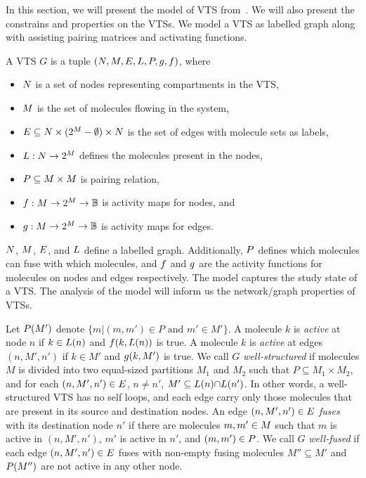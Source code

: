 In this section, we will present the model of VTS from~\cite{PloS,SASB}.
%
We will also present the constrains and properties on the VTSs.   
%
We model a VTS as labelled graph along with assisting pairing matrices and
activating functions.

\begin{df}
  A VTS $G$ is a tuple $(N,M,E,L,P,g,f)$, where
  \begin{itemize}
  \item $N$ is a set of nodes representing compartments in the VTS,
  \item $M$ is the set of molecules flowing in the system, 
  \item $E \subseteq N \times (2^{M}-\emptyset) \times N$ is the
    set of edges with molecule sets as labels,
  \item $L : N \rightarrow 2^{M}$ defines the molecules present in the nodes,
  \item $P \subseteq M \times M$ is pairing relation,
  \item $f : M \rightarrow 2^{M} \rightarrow \mathbb{B}$ is activity maps for nodes, and
  \item $g : M \rightarrow 2^{M} \rightarrow \mathbb{B} $ is activity maps for edges.
  \end{itemize}
\end{df}
$N$, $M$, $E$, and $L$ define a labelled graph.
%
Additionally, $P$ defines which molecules can fuse with which molecules,
and
$f$ and $g$ are the activity functions for molecules on
nodes and edges respectively.
%
The model captures the study state of a VTS.
%
The analysis of the model will inform us the network/graph properties of
VTSs.

Let $P(M')$ denote $\{m|(m,m') \in P \text{ and } m' \in M'\}$.
%
A molecule $k$ is {\em active} at node $n$ if $k \in L(n)$ and
$f(k,L(n))$ is true.
%
A molecule $k$ is {\em active} at edges $(n,M',n')$ if $k \in M'$ and
$g(k,M')$ is true.
%
We call $G$ {\em well-structured} if molecules $M$ is divided into
two equal-sized partitions $M_1$ and $M_2$ such that
$P \subseteq M_1 \times M_2$, and
for each $(n,M',n') \in E$, $n \neq n'$, 
$M' \subseteq L(n) {\cap} L(n')$.
%
In other words, a well-structured VTS has no self loops, and 
each edge carry only those molecules that are present in its source
and destination nodes. 
%
An edge $(n,M',n') \in E$ {\em fuses} with its destination node $n'$
if there are molecules $m,m' \in M$ such that $m$ is active in
$(n,M',n')$, $m'$ is active in $n'$, and $(m,m') \in P$.
%
We call $G$ {\em well-fused} if each edge $(n,M',n') \in E$ fuses
with non-empty fusing molecules $M'' \subseteq M'$
and $P(M'')$ are not active in any other node.


